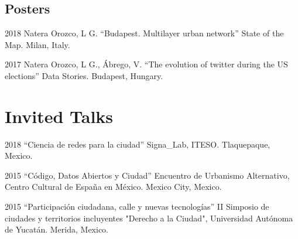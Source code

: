 \documentclass{academiccv}
\begin{document}


	

\subsection*{Posters}

\begin{tablist}
	
	\item[2018] \tab Natera Orozco, L G. \enquote{Budapest. Multilayer urban network} State of the Map. Milan, Italy.
	\item[2017] \tab Natera Orozco, L G., Ábrego, V. \enquote{The evolution of twitter during the US elections} Data Stories. Budapest, Hungary.
	
\end{tablist}


\section*{Invited Talks}

\begin{tablist}

\item[2018] \tab \enquote{Ciencia de redes para la ciudad} Signa\_Lab, ITESO. Tlaquepaque, Mexico.

\item[2015] \tab \enquote{Código, Datos Abiertos y Ciudad} Encuentro de Urbanismo Alternativo, Centro Cultural de España en México. Mexico City, Mexico.

\item[2015] \tab \enquote{Participación ciudadana, calle y nuevas tecnologías} II Simposio de ciudades y territorios incluyentes "Derecho a la Ciudad", Universidad Autónoma de Yucatán. Merida, Mexico.


\end{tablist}
\end{document}
